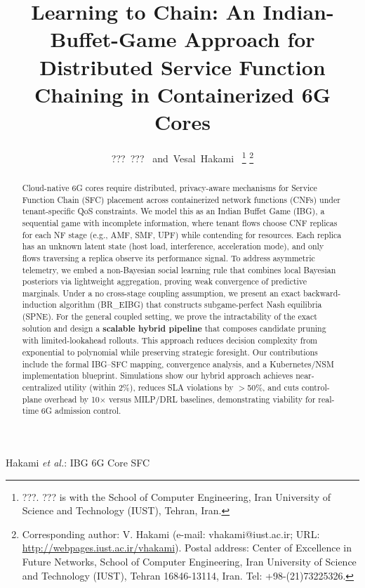 \documentclass[journal]{IEEEtran}
\theoremstyle{plain}
\theoremstyle{definition}
\theoremstyle{remark}
\begin{document}
\title{Learning to Chain: An Indian-Buffet-Game Approach for Distributed Service Function Chaining in Containerized 6G Cores}

\author{???~???~\IEEEmembership{}
        and~Vesal~Hakami~\IEEEmembership{}%
\thanks{???. ??? is with the School of Computer Engineering, Iran University of Science and Technology (IUST), Tehran, Iran.}
\thanks{Corresponding author: V. Hakami (e-mail: vhakami@iust.ac.ir; URL: \url{http://webpages.iust.ac.ir/vhakami}). Postal address: Center of Excellence in Future Networks, School of Computer Engineering, Iran University of Science and Technology (IUST), Tehran 16846-13114, Iran. Tel: +98-(21)73225326.}}


%
{Hakami \MakeLowercase{\textit{et al.}}: IBG 6G Core SFC}


\maketitle


\begin{abstract}
Cloud-native 6G cores require distributed, privacy-aware mechanisms for Service Function Chain (SFC) placement across containerized network functions (CNFs) under tenant-specific QoS constraints. We model this as an Indian Buffet Game (IBG), a sequential game with incomplete information, where tenant flows choose CNF replicas for each NF stage (e.g., AMF, SMF, UPF) while contending for resources. Each replica has an unknown latent state (host load, interference, acceleration mode), and only flows traversing a replica observe its performance signal. To address asymmetric telemetry, we embed a non-Bayesian social learning rule that combines local Bayesian posteriors via lightweight aggregation, proving weak convergence of predictive marginals. Under a no cross-stage coupling assumption, we present an exact backward-induction algorithm (\textsf{BR\_EIBG}) that constructs subgame-perfect Nash equilibria (SPNE). For the general coupled setting, we prove the intractability of the exact solution and design a \textbf{scalable hybrid pipeline} that composes candidate pruning with limited-lookahead rollouts. This approach reduces decision complexity from exponential to polynomial while preserving strategic foresight. Our contributions include the formal IBG–SFC mapping, convergence analysis, and a Kubernetes/NSM implementation blueprint. Simulations show our hybrid approach achieves near-centralized utility (within 2\%), reduces SLA violations by $>$50\%, and cuts control-plane overhead by 10$\times$ versus MILP/DRL baselines, demonstrating viability for real-time 6G admission control.
\end{abstract}
\end{document}
